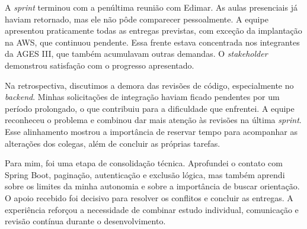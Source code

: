 A \textit{sprint} terminou com a penúltima reunião com Edimar. As aulas presenciais já haviam retornado, mas ele não pôde comparecer pessoalmente. A equipe apresentou praticamente todas as entregas previstas, com exceção da implantação na \ac{AWS}, que continuou pendente. Essa frente estava concentrada nos integrantes da \ac{AGES} III, que também acumulavam outras demandas. O \textit{stakeholder} demonstrou satisfação com o progresso apresentado.

Na retrospectiva, discutimos a demora das revisões de código, especialmente no \textit{backend}. Minhas solicitações de integração haviam ficado pendentes por um período prolongado, o que contribuiu para a dificuldade que enfrentei. A equipe reconheceu o problema e combinou dar mais atenção às revisões na última \textit{sprint}. Esse alinhamento mostrou a importância de reservar tempo para acompanhar as alterações dos colegas, além de concluir as próprias tarefas.

Para mim, foi uma etapa de consolidação técnica. Aprofundei o contato com Spring Boot, paginação, autenticação e exclusão lógica, mas também aprendi sobre os limites da minha autonomia e sobre a importância de buscar orientação. O apoio recebido foi decisivo para resolver os conflitos e concluir as entregas. A experiência reforçou a necessidade de combinar estudo individual, comunicação e revisão contínua durante o desenvolvimento.
